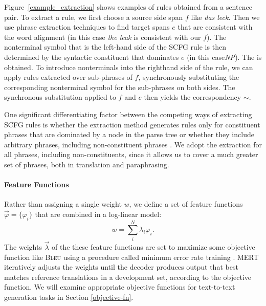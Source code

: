 \documentclass[11pt]{article}
\begin{document}
Figure~\ref{example_extraction} shows examples
of rules obtained from a sentence pair. To extract a rule, we first
choose a source side span $f$ like {\it das leck}.  Then we use phrase extraction techniques to find  target spans $e$ that are consistent with the word alignment (in this case {\it the leak} is consistent with our $f$). The nonterminal symbol that is the left-hand side of the SCFG rule is then determined by the  syntactic constituent that dominates $e$ (in this case{\it NP}). 
The is obtained.  To introduce nonterminals into the righthand side of the rule, we
can apply rules extracted over sub-phrases of $f$, synchronously
substituting the corresponding nonterminal symbol for the sub-phrases
on both sides. The synchronous substitution applied to $f$ and $e$
then yields the correspondency $\sim$.

One significant differentiating factor between the competing ways of
extracting SCFG rules is whether the extraction method generates rules
only for constituent phrases that are dominated by a node in the parse
tree \cite{Galley2004,cohn-lapata:2008} or whether they include
arbitrary phrases, including non-constituent phrases
\cite{Zollmann2006,Callison-Burch2008}. We adopt the extraction for
all phrases, including non-constituents, since it allows us to cover a
much greater set of phrases, both in translation and paraphrasing.




\paragraph{Feature Functions}

Rather than assigning a single weight $w$, we define a set of feature
functions $\vec{\varphi} = \{\varphi_i\}$ that are combined in a
log-linear model:
\begin{equation}
  w = \sum_i^N \lambda_i \varphi_i .
\end{equation}
The weights $\vec{\lambda}$ of the these feature functions are set to
maximize some objective function like \textsc{Bleu}
\cite{Papineni2002} using a procedure called minimum error rate
training \cite{Och2003c}.  MERT iteratively adjusts the weights until
the decoder produces output that best matches reference translations
in a development set, according to the objective function.  We will
examine appropriate objective functions for text-to-text generation
tasks in Section \ref{objective-fn}.
\end{document}

